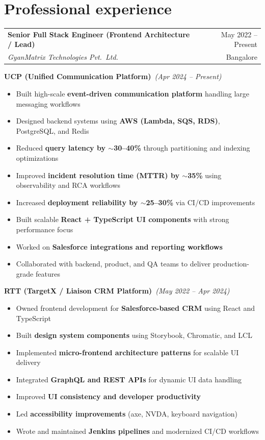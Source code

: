 \documentclass[11pt,a4paper]{article}
\makeatletter
\newcommand{\jobtitle}[4]{%
  \vspace{0.35em}
  \noindent
  \begin{tabular*}{\linewidth}{@{}l@{\extracolsep{\fill}}r@{}}
    \textbf{#2} & \small\color{textmuted}#1 \\
    \textit{\color{textmuted}#3} & \small\color{textmuted}#4 \\
  \end{tabular*}\par
  \vspace{0.25em}
}
\newcommand{\subproject}[2]{%
  \vspace{0.35em}
  \noindent\textbf{#1}\textit{\small\color{textmuted}\ #2}\par
}
\makeatother
\begin{document}
\section{Professional experience}

\jobtitle{May 2022 -- Present}{Senior Full Stack Engineer (Frontend Architecture / Lead)}{GyanMatrix Technologies Pvt.\ Ltd.}{Bangalore}

\subproject{UCP (Unified Communication Platform)}{(Apr 2024 -- Present)}
\begin{itemize}
\item Built high-scale \textbf{event-driven communication platform} handling large messaging workflows
\item Designed backend systems using \textbf{AWS (Lambda, SQS, RDS)}, PostgreSQL, and Redis
\item Reduced \textbf{query latency by $\sim$30--40\%} through partitioning and indexing optimizations
\item Improved \textbf{incident resolution time (MTTR) by $\sim$35\%} using observability and RCA workflows
\item Increased \textbf{deployment reliability by $\sim$25--30\%} via CI/CD improvements
\item Built scalable \textbf{React + TypeScript UI components} with strong performance focus
\item Worked on \textbf{Salesforce integrations and reporting workflows}
\item Collaborated with backend, product, and QA teams to deliver production-grade features
\end{itemize}

\subproject{RTT (TargetX / Liaison CRM Platform)}{(May 2022 -- Apr 2024)}
\begin{itemize}
\item Owned frontend development for \textbf{Salesforce-based CRM} using React and TypeScript
\item Built \textbf{design system components} using Storybook, Chromatic, and LCL
\item Implemented \textbf{micro-frontend architecture patterns} for scalable UI delivery
\item Integrated \textbf{GraphQL and REST APIs} for dynamic UI data handling
\item Improved \textbf{UI consistency and developer productivity}
\item Led \textbf{accessibility improvements} (axe, NVDA, keyboard navigation)
\item Wrote and maintained \textbf{Jenkins pipelines} and modernized CI/CD workflows
\end{itemize}
\end{document}
